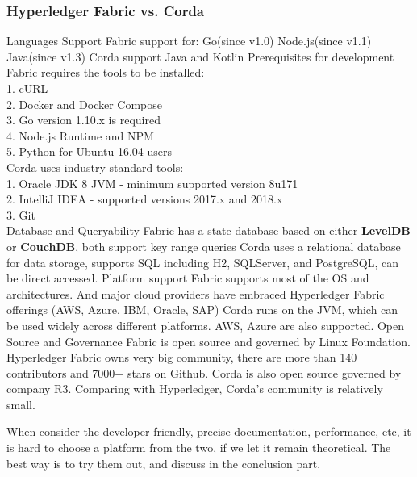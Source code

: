 \subsubsection{Hyperledger Fabric vs. Corda}
\begin{outline}
	\1 Languages Support
		\2 Fabric support for: 
			\3 Go(since v1.0)
			\3 Node.js(since v1.1)
			\3 Java(since v1.3)
		\2 Corda support Java and Kotlin
	\1 Prerequisites for development
		\2 Fabric requires the tools to be installed:\\ 
			1. cURL\\
			2. Docker and Docker Compose\\
			3. Go version 1.10.x is required\\
			4. Node.js Runtime and NPM\\
			5. Python for Ubuntu 16.04 users\\
		\2 Corda uses industry-standard tools: \\
			1. Oracle JDK 8 JVM - minimum supported version 8u171\\
		    2. IntelliJ IDEA - supported versions 2017.x and 2018.x\\
		    3. Git\\
	\1 Database and Queryability
		\2 Fabric has a state database based on either \textbf{LevelDB} or \textbf{CouchDB}, both support key range queries
		\2 Corda uses a relational database for data storage, supports SQL  including H2, SQLServer, and PostgreSQL, can be direct accessed.
	\1 Platform support
		\2 Fabric supports most of the OS and architectures. And major cloud providers have embraced Hyperledger Fabric offerings (AWS, Azure, IBM, Oracle, SAP) 
		\2 Corda runs on the JVM, which can be used widely across different platforms. AWS, Azure are also supported.
     \1 Open Source and Governance
     	\2 Fabric is open source and governed by Linux Foundation. Hyperledger Fabric owns very big community, there are more than 140 contributors and 7000+ stars on Github. 
     	\2 Corda is  also open source governed by company R3. Comparing with Hyperledger, Corda's community is relatively small.
\end{outline}

When consider the developer friendly, precise documentation, performance, etc, it is hard to choose a platform from the two, if we let it remain theoretical. The best way is to try them out, and discuss in the conclusion part.
